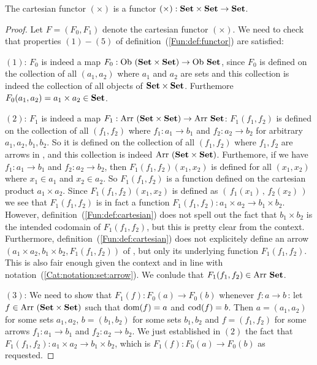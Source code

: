 \begin{prop}\label{Fun:prop:cartesian}
    The cartesian functor $(\times)$ is a functor $(\times):\mbox{\bf Set}\times\mbox{\bf Set}
    \to\mbox{\bf Set}$. 
\end{prop}
\begin{proof}
    Let $F=(F_{0},F_{1})$ denote the cartesian functor $(\times)$. We need
    to check that properties $(1)-(5)$ of definition~(\ref{Fun:def:functor}) 
    are satisfied:

    $(1)$: $F_{0}$ is indeed a map $F_{0}:\ob\ (\Set\times\Set)\to\ob\ \Set$, 
    since $F_{0}$ is defined on the collection of all $(a_{1},a_{2})$ where
    $a_{1}$ and $a_{2}$ are sets and this collection is indeed the collection
    of all objects of $\mbox{\bf Set}\times\mbox{\bf Set}$. Furthemore $F_{0}(a_{1},a_{2})=
    a_{1}\times a_{2}\in\mbox{\bf Set}$.

    $(2)$: $F_{1}$ is indeed a map $F_{1}:\arr\ (\Set\times\Set)\to\arr\ \Set$:
    $F_{1}(f_{1},f_{2})$ is defined on the collection of all $(f_{1},f_{2})$
    where $f_{1}:a_{1}\to b_{1}$ and $f_{2}:a_{2}\to b_{2}$ for arbitrary
    $a_{1}, a_{2}, b_{1}, b_{2}$. So it is defined on the collection of all
    $(f_{1},f_{2})$ where $f_{1},f_{2}$ are arrows in \Set, and this collection
    is indeed $\mbox{\rm Arr}\ (\mbox{\bf Set}\times\mbox{\bf Set})$. Furthemore, if we have $f_{1}:a_{1}\to 
    b_{1}$ and $f_{2}:a_{2}\to b_{2}$, then $F_{1}(f_{1},f_{2})(x_{1},x_{2})$ is 
    defined for all $(x_{1},x_{2})$ where $x_{1}\in a_{1}$ and $x_{2}\in a_{2}$.
    So $F_{1}(f_{1},f_{2})$ is a function defined on the 
    cartesian product $a_{1}\times a_{2}$. Since $F_{1}(f_{1},f_{2})(x_{1},x_{2})$
    is defined as $(\,f_{1}(x_{1})\,,\,f_{2}(x_{2})\,)$ we see that $F_{1}
    (f_{1},f_{2})$ is in fact a function $F_{1}(f_{1},f_{2}):a_{1}\times a_{2}
    \to b_{1}\times b_{2}$. However, definition~(\ref{Fun:def:cartesian}) does
    not spell out the fact that $b_{1}\times b_{2}$ is the intended codomain
    of $F_{1}(f_{1},f_{2})$, but this is pretty clear from the context.
    Furthermore, definition~(\ref{Fun:def:cartesian}) does not explicitely 
    define an arrow $(a_{1}\times a_{2},b_{1}\times b_{2},F_{1}(f_{1},f_{2}))$ of 
    \Set, but only its underlying function $F_{1}(f_{1},f_{2})$. This is also 
    fair enough given the context and in line with 
    notation~(\ref{Cat:notation:set:arrow}). We conlude that $F_{1}(f_{1},f_{2})
    \in\mbox{\rm Arr}\ \mbox{\bf Set}$.

    $(3)$: We need to show that $F_{1}(f):F_{0}(a)\to F_{0}(b)$ whenever
    $f:a\to b$\,: let $f\in\mbox{\rm Arr}\ (\mbox{\bf Set}\times\mbox{\bf Set})$ such that $\mbox{\rm dom}(f)=a$ and
    $\mbox{\rm cod}(f)=b$. Then $a=(a_{1},a_{2})$ for some sets $a_{1},a_{2}$, $b=
    (b_{1},b_{2})$ for some sets $b_{1},b_{2}$ and $f=(f_{1},f_{2})$ for some
    arrows $f_{1}:a_{1}\to b_{1}$ and $f_{2}:a_{2}\to b_{2}$. We just established
    in $(2)$ the fact that $F_{1}(f_{1},f_{2}):a_{1}\times a_{2}\to b_{1}
    \times b_{2}$, which is $F_{1}(f):F_{0}(a)\to F_{0}(b)$ as requested.


\end{proof}
